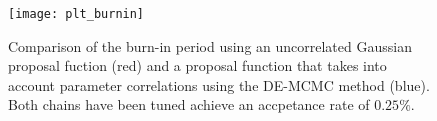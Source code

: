 \begin{figure}[h]
\begin{center}
\texttt{[image: plt\_burnin]}
\end{center}
\caption{Comparison of the burn-in period using an uncorrelated Gaussian
proposal fuction (red) and a proposal function that takes into account
parameter correlations using the DE-MCMC method (blue).  Both chains have been
tuned achieve an accpetance rate of $0.25\%$.}
\label{fig:burnin}
\end{figure}






